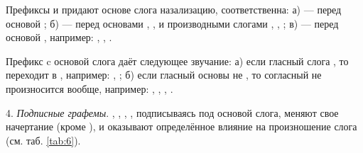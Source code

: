 Префиксы  и  придают основе слога назализацию, соответственна: а) {} --- перед основой ; б) {} --- перед основами , ,  и производными слогами , , ; в) {} --- перед основой , например: \toneV, \toneV, \toneV.

Префикс  c основой слога  даёт следующее звучание: а) если гласный слога {}, то {} переходит в {}, например: \toneR, \toneR; б) если гласный основы не {}, то согласный не произносится вообще, например: \toneR, \toneR, \toneR, \toneR.

4. \emph{Подписные графемы}. , , , , подписываясь под основой слога, меняют свое начертание (кроме ), и оказывают определённое влияние на произношение слога (см. таб. \ref{tab:6}).

